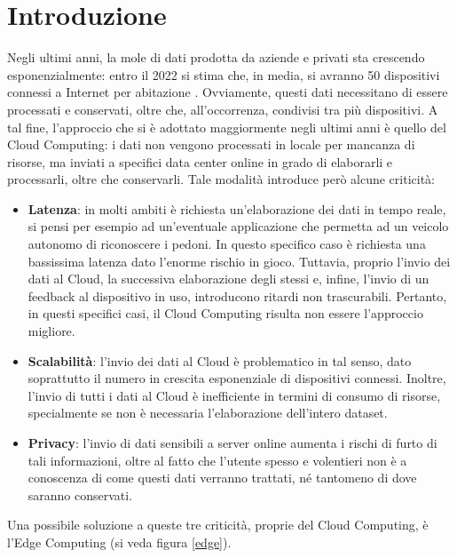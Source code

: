 \chapter{Introduzione}
Negli ultimi anni, la mole di dati prodotta da aziende e privati sta crescendo esponenzialmente: entro il 2022 si stima che, in media, si avranno 50 dispositivi connessi a Internet per abitazione \cite{iotedge}. Ovviamente, questi dati necessitano di essere processati e conservati, oltre che, all'occorrenza, condivisi tra più dispositivi. A tal fine, l'approccio che si è adottato maggiormente negli ultimi anni è quello del Cloud Computing: i dati non vengono processati in locale per mancanza di risorse, ma inviati a specifici data center online in grado di elaborarli e processarli, oltre che conservarli. Tale modalità introduce però alcune criticità:

\begin{itemize}
	\item \textbf{Latenza}: in molti ambiti è richiesta un'elaborazione dei dati in tempo reale, si pensi per esempio ad un'eventuale applicazione che permetta ad un veicolo autonomo di riconoscere i pedoni. In questo specifico caso è richiesta una bassissima latenza dato l'enorme rischio in gioco. Tuttavia, proprio l'invio dei dati al Cloud, la successiva elaborazione degli stessi e, infine, l'invio di un feedback al dispositivo in uso, introducono ritardi non trascurabili. Pertanto, in questi specifici casi, il Cloud Computing risulta non essere l'approccio migliore.
	\item \textbf{Scalabilità}: l'invio dei dati al Cloud è problematico in tal senso, dato soprattutto il numero in crescita esponenziale di dispositivi connessi. Inoltre, l'invio di tutti i dati al Cloud è inefficiente in termini di consumo di risorse, specialmente se non è necessaria l'elaborazione dell'intero dataset.
	\item \textbf{Privacy}: l'invio di dati sensibili a server online aumenta i rischi di furto di tali informazioni, oltre al fatto che l'utente spesso e volentieri non è a conoscenza di come questi dati verranno trattati, né tantomeno di dove saranno conservati.
\end{itemize}

Una possibile soluzione a queste tre criticità, proprie del Cloud Computing, è l'Edge Computing (si veda figura \ref{edge}). 

